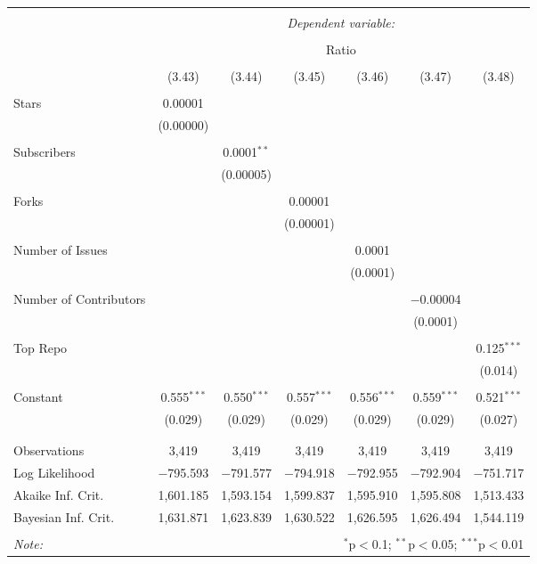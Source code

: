 
\begin{tabular}{@{\extracolsep{5pt}}lcccccc}
\\[-1.8ex]\hline
\hline \\[-1.8ex]
 & \multicolumn{6}{c}{\textit{Dependent variable:}} \\
\cline{2-7}
\\[-1.8ex] & \multicolumn{6}{c}{Ratio} \\
\\[-1.8ex] & (3.43) & (3.44) & (3.45) & (3.46) & (3.47) & (3.48)\\
\hline \\[-1.8ex]
 Stars & 0.00001 &  &  &  &  &  \\
  & (0.00000) &  &  &  &  &  \\
  & & & & & & \\
 Subscribers &  & 0.0001$^{**}$ &  &  &  &  \\
  &  & (0.00005) &  &  &  &  \\
  & & & & & & \\
 Forks &  &  & 0.00001 &  &  &  \\
  &  &  & (0.00001) &  &  &  \\
  & & & & & & \\
 Number of Issues &  &  &  & 0.0001 &  &  \\
  &  &  &  & (0.0001) &  &  \\
  & & & & & & \\
 Number of Contributors &  &  &  &  & $-$0.00004 &  \\
  &  &  &  &  & (0.0001) &  \\
  & & & & & & \\
 Top Repo &  &  &  &  &  & 0.125$^{***}$ \\
  &  &  &  &  &  & (0.014) \\
  & & & & & & \\
 Constant & 0.555$^{***}$ & 0.550$^{***}$ & 0.557$^{***}$ & 0.556$^{***}$ & 0.559$^{***}$ & 0.521$^{***}$ \\
  & (0.029) & (0.029) & (0.029) & (0.029) & (0.029) & (0.027) \\
  & & & & & & \\
\hline \\[-1.8ex]
Observations & 3,419 & 3,419 & 3,419 & 3,419 & 3,419 & 3,419 \\
Log Likelihood & $-$795.593 & $-$791.577 & $-$794.918 & $-$792.955 & $-$792.904 & $-$751.717 \\
Akaike Inf. Crit. & 1,601.185 & 1,593.154 & 1,599.837 & 1,595.910 & 1,595.808 & 1,513.433 \\
Bayesian Inf. Crit. & 1,631.871 & 1,623.839 & 1,630.522 & 1,626.595 & 1,626.494 & 1,544.119 \\
\hline
\hline \\[-1.8ex]
\textit{Note:}  & \multicolumn{6}{r}{$^{*}$p$<$0.1; $^{**}$p$<$0.05; $^{***}$p$<$0.01} \\
\end{tabular}
